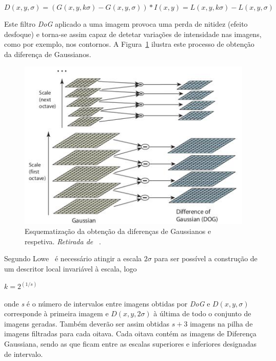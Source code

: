 \begin{enumerate}
\begin{equation}
D\left ( x, y, \sigma  \right ) = \left (  G\left ( x, y, k\sigma  \right ) - G\left ( x, y, \sigma \right ) \right )* I\left ( x, y \right ) = L\left ( x, y, k\sigma  \right ) - L\left ( x, y, \sigma  \right )
\label{eq:resdog}
\end{equation}

Este filtro \textit{DoG} aplicado a uma imagem provoca uma perda de nitidez (efeito desfoque) e torna-se assim capaz de detetar variações de intensidade nas imagens, como por exemplo, nos contornos. A Figura~\ref{fig:siftdog} ilustra este processo de obtenção da diferença de Gaussianos. %

\begin{figure}[h]
\centering
\includegraphics[width=0.7\linewidth]{./figures/sift_dog.jpg}
\caption{ Esquematização da obtenção da diferenças de Gaussianos e respetiva. \textit{Retirada de}~\cite{Lowe2004} .}
\label{fig:siftdog}
\end{figure}

Segundo Lowe~\cite{Lowe2004}  é necessário atingir a escala $ 2\sigma $ para ser possível a construção de um descritor local invariável à escala, logo

$ k = 2^{\left(1/s \right)} $

onde \textit{s} é o número de intervalos entre imagens obtidas por \textit{DoG} e $ D(x, y, \sigma) $ corresponde à primeira imagem e $ D(x, y, 2\sigma) $ à última de todo o conjunto de imagens geradas. Também deverão ser assim obtidas $s + 3$ imagens na pilha de imagens filtradas para cada oitava. Cada oitava contém as imagens de Diferença Gaussiana, sendo as que ficam entre as escalas superiores e inferiores designadas de intervalo. 


\end{enumerate}
